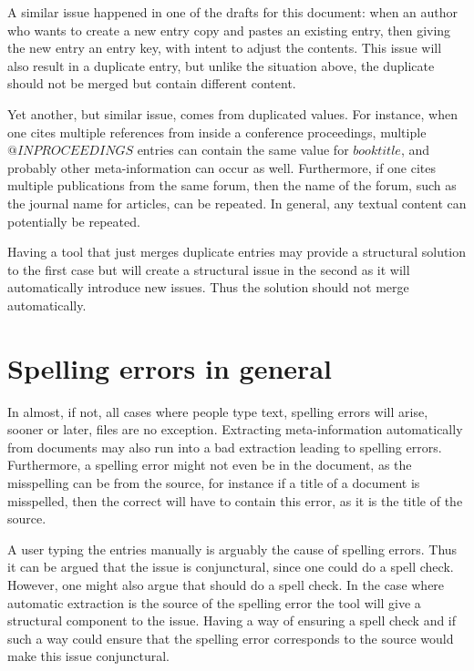 A similar issue happened in one of the drafts for this document: when
an author who wants to create a new entry copy and pastes an existing
entry, then giving the new entry an entry key, with intent to adjust
the contents.  This issue will also result in a duplicate entry, but
unlike the situation above, the duplicate should not be merged but
contain different content.

Yet another, but similar issue, comes from duplicated values.  For
instance, when one cites multiple references from inside a conference
proceedings, multiple $@INPROCEEDINGS$ entries can contain the same
value for $booktitle$, and probably other meta-information can occur
as well.  Furthermore, if one cites multiple publications from the
same forum, then the name of the forum, such as the journal name for
articles, can be repeated.  In general, any textual content can
potentially be repeated.

Having a tool that just merges duplicate entries may provide a
structural solution to the first case but will create a structural
issue in the second as it will automatically introduce new issues.
Thus the solution should not merge automatically.


\section{Spelling errors in general}
\label{sec:problems_spelling}

In almost, if not, all cases where people type text, spelling errors
will arise, sooner or later, {\bibtex} files are no exception.
Extracting meta-information automatically from documents may also run
into a bad extraction leading to spelling errors.  Furthermore, a
spelling error might not even be in the {\bibtex} document, as the
misspelling can be from the source, for instance if a title of a
document is misspelled, then the correct {\bibtex} will have to
contain this error, as it is the title of the source.

A user typing the entries manually is arguably the cause of spelling
errors.  Thus it can be argued that the issue is conjunctural, since
one could do a spell check.  However, one might also argue that
{\bibtex} should do a spell check.  In the case where automatic
extraction is the source of the spelling error the tool will give a
structural component to the issue.  Having a way of ensuring a spell
check and if such a way could ensure that the spelling error
corresponds to the source would make this issue conjunctural.


